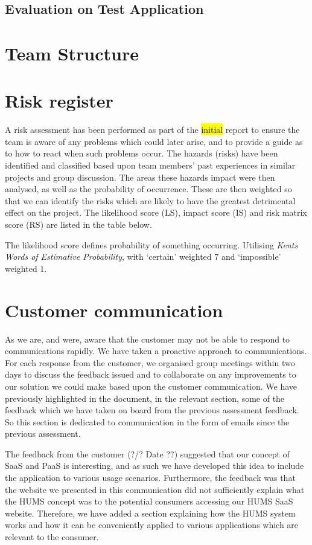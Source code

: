 \documentclass[10pt,a4paper]{article}
\begin{document}
\subsection{Evaluation on Test Application}

\section{Team Structure}

\section{Risk register}
A risk assessment has been performed as part of the \hl{initial} report to ensure the team is aware of any problems which could later arise, and to provide a guide as to how to react when such problems occur. The hazards (risks) have been identified and classified based upon team members' past experiences in similar projects and group discussion. The areas these hazards impact were then analysed, as well as the probability of occurrence. These are then weighted so that we can identify the risks which are likely to have the greatest detrimental effect on the project. The likelihood score (LS), impact score (IS) and risk matrix score (RS) are listed in the table below.



The likelihood score defines probability of something occurring. Utilising
\textit{Kents Words of Estimative Probability}\cite{kent1966strategic}, with
`certain' weighted $7$ and `impossible' weighted $1$.




\section{Customer communication}
As we are, and were, aware that the customer may not be able to respond to communications rapidly. We have taken a proactive approach to communications. For each response from the customer, we organised group meetings within two days to discuss the feedback issued and to collaborate on any improvements to our solution we could make based upon the customer communication. We have previously highlighted in the document, in the relevant section, some of the feedback which we have taken on board from the previous assessment feedback. So this section is dedicated to communication in the form of emails since the previous assessment.

The feedback from the customer (?/? Date ??) suggested that our concept of SaaS and PaaS is interesting, and as such we have developed this idea to include the application to various usage scenarios. Furthermore, the feedback was that the website we presented in this communication did not sufficiently explain what the HUMS concept was to the potential consumers accessing our HUMS SaaS website. Therefore, we have added a section explaining how the HUMS system works and how it can be conveniently applied to various applications which are relevant to the consumer.

\vfill


\end{document}
